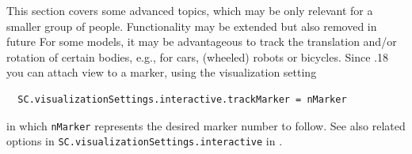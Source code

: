 %
This section covers some advanced topics, which may be only relevant for a smaller group of people. 
Functionality may be extended but also removed in future
%
%
For some models, it may be advantageous to track the translation and/or rotation of certain bodies, e.g., for cars, (wheeled) robots or bicycles. 
Since .18 you can attach view to a marker, using the visualization setting
\pythonstyle\begin{lstlisting}
  SC.visualizationSettings.interactive.trackMarker = nMarker
\end{lstlisting}
in which \texttt{nMarker} represents the desired marker number to follow.
See also related options in \texttt{SC.visualizationSettings.interactive} in .

